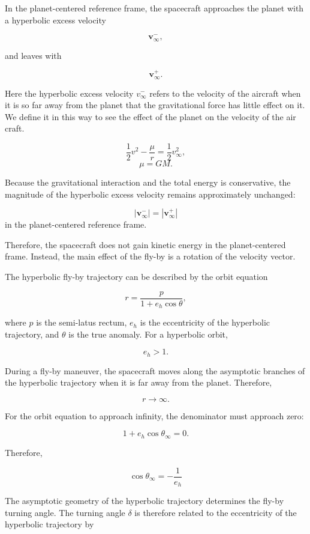 \documentclass[11pt,a4paper]{article}
\begin{document}
In the planet-centered reference frame, the spacecraft approaches the planet
with a hyperbolic excess velocity \cite{orbitalflyby}

\[
\mathbf{v}_{\infty}^{-},
\]

and leaves with

\[
\mathbf{v}_{\infty}^{+}.
\]

Here the hyperbolic excess velocity $v_\infty^{-}$ refers to the velocity of the aircraft when it is so far away from the planet that the gravitational force has little effect on it. We define it in this way to see the effect of the planet on the velocity of the air craft.

\[
\frac{1}{2}v^2 - \frac{\mu}{r} = \frac{1}{2}v_\infty^2,
\]
\[
\mu = GM.
\]

Because the gravitational interaction and the total energy is conservative, the magnitude of the hyperbolic excess velocity remains approximately unchanged:

\[
\left|\mathbf{v}_{\infty}^{-}\right|
=
\left|\mathbf{v}_{\infty}^{+}\right|
\]
in the planet-centered reference frame.

Therefore, the spacecraft does not gain kinetic energy in the planet-centered
frame. Instead, the main effect of the fly-by is a rotation of the velocity
vector.

The hyperbolic fly-by trajectory can be described by the orbit equation

\[
r=\frac{p}{1+e_h\cos\theta},
\]

where $p$ is the semi-latus rectum, $e_h$ is the eccentricity of the
hyperbolic trajectory, and $\theta$ is the true anomaly. For a hyperbolic
orbit,

\[
e_h>1.
\]

During a fly-by maneuver, the spacecraft moves along the asymptotic branches
of the hyperbolic trajectory when it is far away from the planet. Therefore,

\[
r\rightarrow\infty .
\]

For the orbit equation to approach infinity, the denominator must approach
zero:

\[
1+e_h\cos\theta_\infty=0.
\]

Therefore,

\[
\cos\theta_\infty=-\frac{1}{e_h}
\]

The asymptotic geometry of the hyperbolic trajectory determines the fly-by
turning angle. The turning angle $\delta$ is therefore related to the
eccentricity of the hyperbolic trajectory by
\end{document}
